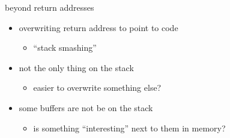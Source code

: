 \begin{frame}{beyond return addresses}
     \begin{itemize}
    \item overwriting return address to point to code
        \begin{itemize}
        \item ``stack smashing''
        \end{itemize}
    \item not the only thing on the stack
        \begin{itemize}
        \item easier to overwrite something else?
        \end{itemize}
    \item some buffers are not be on the stack
        \begin{itemize}
        \item is something ``interesting'' next to them in memory?
        \end{itemize}
    \end{itemize}
\end{frame}
